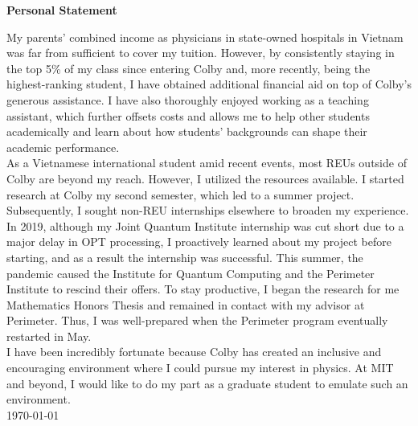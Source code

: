 \documentclass[12pt]{article}
\begin{document}
\begin{center}
	\textbf{Personal Statement}
\end{center}
My parents' combined income as physicians in state-owned hospitals in Vietnam was far from sufficient to cover my tuition. However, by consistently staying in the top 5\% of my class since entering Colby and, more recently, being the highest-ranking student, I have obtained additional financial aid on top of Colby's generous assistance. I have also thoroughly enjoyed working as a teaching assistant, which further offsets costs and allows me to help other students academically and learn about how students' backgrounds can shape their academic performance. \\

As a Vietnamese international student amid recent events, most REUs outside of Colby are beyond my reach. However, I utilized the resources available. I started research at Colby my second semester, which led to a summer project. Subsequently, I sought non-REU internships elsewhere to broaden my experience. In 2019, although my Joint Quantum Institute internship was cut short due to a major delay in OPT processing, I proactively learned about my project before starting, and as a result the internship was successful. This summer, the pandemic caused the Institute for Quantum Computing and the Perimeter Institute to rescind their offers. To stay productive, I began the research for me Mathematics Honors Thesis and remained in contact with my advisor at Perimeter. Thus, I was well-prepared when the Perimeter program eventually restarted in May.\\

I have been incredibly fortunate because Colby has created an inclusive and encouraging environment where I could pursue my interest in physics. At MIT and beyond, I would like to do my part as a graduate student to emulate such an environment.\\

\noindent \today
\end{document}
